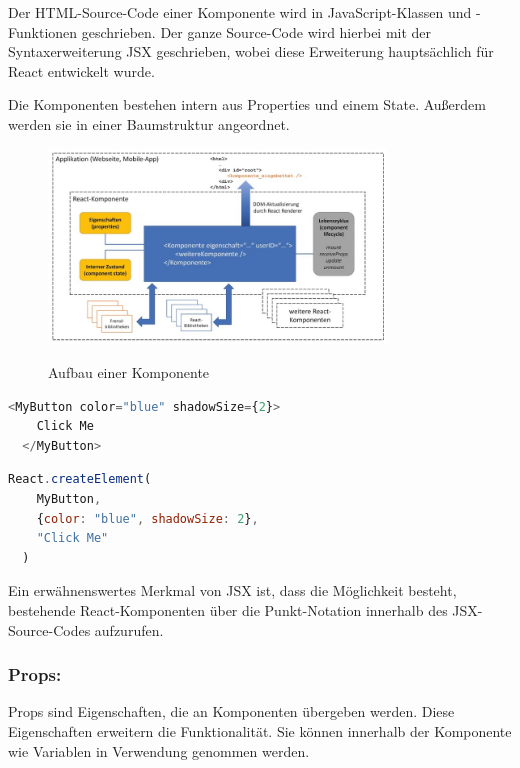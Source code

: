 Der HTML-Source-Code einer Komponente wird in JavaScript-Klassen und -Funktionen geschrieben. Der ganze Source-Code wird hierbei mit der Syntaxerweiterung JSX geschrieben, wobei diese Erweiterung hauptsächlich für React entwickelt wurde.

Die Komponenten bestehen intern aus Properties und einem State. Außerdem werden sie in einer Baumstruktur angeordnet.
\cite{WasIstReact}

\begin{figure}[H]
  \centering
  \includegraphics[width=0.8\textwidth]{pics/aufbauReactComponent.jpg}
  \caption{Aufbau einer Komponente}
  \cite{WasIstReact}
\end{figure}

\newpage

\begin{lstlisting}[language=JavaScript, caption=JSX-Code, label=lst:impl:jsx]
  <MyButton color="blue" shadowSize={2}>
    Click Me
  </MyButton>
\end{lstlisting}\cite{JSX}
 
\begin{lstlisting}[language=JavaScript, caption=JSX-Code in gewöhnliches JavaScript kompiliert, label=lst:impl:jsxInJS]
  React.createElement(
    MyButton,
    {color: "blue", shadowSize: 2},
    "Click Me"
  )
\end{lstlisting}\cite{JSX}

Ein erwähnenswertes Merkmal von JSX ist, dass die Möglichkeit besteht, bestehende React-Komponenten über die Punkt-Notation innerhalb des JSX-Source-Codes aufzurufen.
\cite{JSX}

\subsubsection{Props:}
Props sind Eigenschaften, die an Komponenten übergeben werden. Diese Eigenschaften erweitern die Funktionalität. Sie können innerhalb der Komponente wie Variablen in Verwendung genommen werden.
\cite{PropsAndComponents} \\
 
